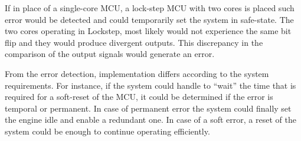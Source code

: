 If in place of a single-core MCU, a lock-step MCU with two cores is placed such error would be detected and could temporarily set the system in safe-state. The
two cores operating in Lockstep, most likely would not experience the same bit flip
and they would produce divergent outputs. This discrepancy in the comparison of
the output signals would generate an error.


From the error detection, implementation differs according to the system requirements. For instance, if the system could handle to “wait” the time that is required for a
soft-reset of the MCU, it could be determined if the error is temporal or permanent.
In case of permanent error the system could finally set the engine idle and enable
a redundant one. In case of a soft error, a reset of the system could be enough to
continue operating efficiently.

